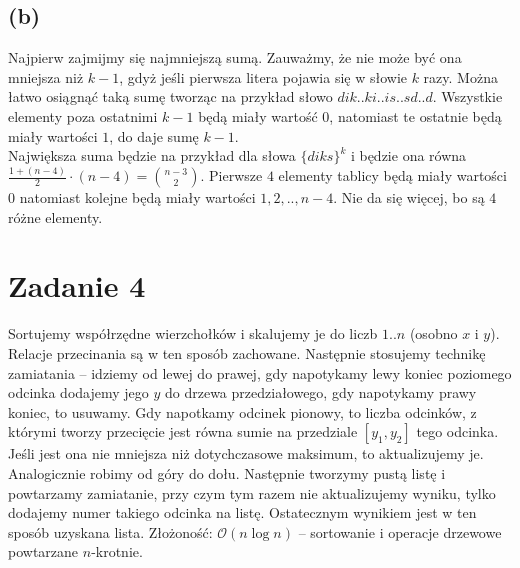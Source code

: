 \documentclass[12pt, a4paper]{article}
\newcommand{\MCALO}{\mathcal{O}}
\begin{document}
\subsection*{{(b)}}
Najpierw zajmijmy się najmniejszą sumą. Zauważmy, że nie może być ona mniejsza
niż $k-1$, gdyż jeśli pierwsza litera pojawia się w słowie $k$ razy. Można
łatwo osiągnąć taką sumę tworząc na przykład słowo $dik..ki..is..sd..d$.
Wszystkie elementy poza ostatnimi $k-1$ będą miały wartość $0$, natomiast te
ostatnie będą miały wartości $1$, do daje sumę $k-1$.\\ Największa suma będzie
na przykład dla słowa $\{diks\}^{k}$ i będzie ona równa $\frac{1 + (n-4)}{2}
\cdot (n-4) = \binom{n-3}{2}$. Pierwsze $4$ elementy tablicy będą miały
wartości $0$ natomiast kolejne będą miały wartości $1,2,..,n-4$. Nie da się więcej, bo
są $4$ różne elementy.

\section*{Zadanie 4}
Sortujemy współrzędne wierzchołków i skalujemy je do liczb $1..n$ (osobno $x$
i $y$). Relacje przecinania są w ten sposób zachowane. Następnie stosujemy
technikę zamiatania -- idziemy od lewej do prawej, gdy napotykamy lewy koniec
poziomego odcinka dodajemy jego $y$ do drzewa przedziałowego, gdy napotykamy
prawy koniec, to usuwamy. Gdy napotkamy odcinek pionowy, to liczba odcinków,
z którymi tworzy przecięcie jest równa sumie na przedziale $[y_1,y_2]$ tego
odcinka. Jeśli jest ona nie mniejsza niż dotychczasowe maksimum, to
aktualizujemy je. Analogicznie robimy od góry do dołu. Następnie tworzymy pustą
listę i powtarzamy zamiatanie, przy czym tym razem nie aktualizujemy wyniku,
tylko dodajemy numer takiego odcinka na listę. Ostatecznym wynikiem jest w ten
sposób uzyskana lista. Złożoność: $\MCALO(n\log{n})$ -- sortowanie i operacje
drzewowe powtarzane $n$-krotnie.
\end{document}
